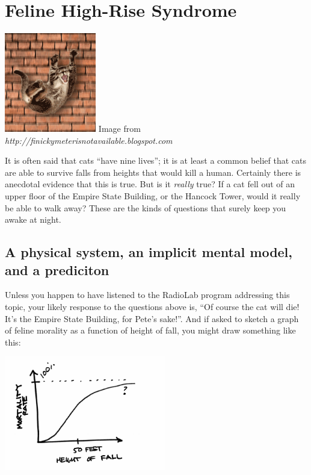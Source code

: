 \chapter{Feline High-Rise Syndrome}

\begin{marginfigure}
\includegraphics[width=4cm]{figs/CatFall}
Image from {\em{http://finickymeterisnotavailable.blogspot.com}}
\end{marginfigure}

It is often said that cats ``have nine lives''; it is at least a common belief that cats are able to survive falls 
from heights that would kill a human.  Certainly there is anecdotal evidence that this is true.
  But is it {\it really} true?  If a cat fell out of an upper floor of the Empire State Building, or the Hancock Tower, would it really be able to walk away?  These are the kinds of questions that surely keep you awake at night.


\section{A physical system, an implicit mental model, and a prediciton}

Unless you happen to have listened to the RadioLab program addressing this topic, your likely response to the questions above is, ``Of course the cat will die!  It's the Empire State Building, for Pete's sake!''.  And if asked to sketch a graph of feline morality as a function of height of fall, you might draw something like this:

\centerline{\includegraphics[height=5cm]{figs/InitialPrediction}}

